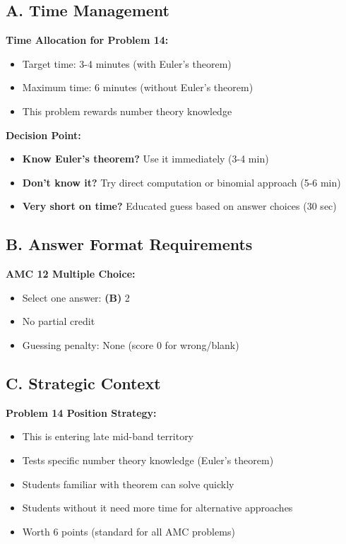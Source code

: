 \documentclass[12pt]{article}
\begin{document}
\begin{competitionbox}
\subsection*{A. Time Management}

\textbf{Time Allocation for Problem 14:}
\begin{itemize}
    \item Target time: 3-4 minutes (with Euler's theorem)
    \item Maximum time: 6 minutes (without Euler's theorem)
    \item This problem rewards number theory knowledge
\end{itemize}

\textbf{Decision Point:}
\begin{itemize}
    \item \textbf{Know Euler's theorem?} Use it immediately (3-4 min)
    \item \textbf{Don't know it?} Try direct computation or binomial approach (5-6 min)
    \item \textbf{Very short on time?} Educated guess based on answer choices (30 sec)
\end{itemize}

\subsection*{B. Answer Format Requirements}

\textbf{AMC 12 Multiple Choice:}
\begin{itemize}
    \item Select one answer: \textbf{(B)} 2
    \item No partial credit
    \item Guessing penalty: None (score 0 for wrong/blank)
\end{itemize}

\subsection*{C. Strategic Context}

\textbf{Problem 14 Position Strategy:}
\begin{itemize}
    \item This is entering late mid-band territory
    \item Tests specific number theory knowledge (Euler's theorem)
    \item Students familiar with theorem can solve quickly
    \item Students without it need more time for alternative approaches
    \item Worth 6 points (standard for all AMC problems)
\end{itemize}


\end{competitionbox}
\end{document}

